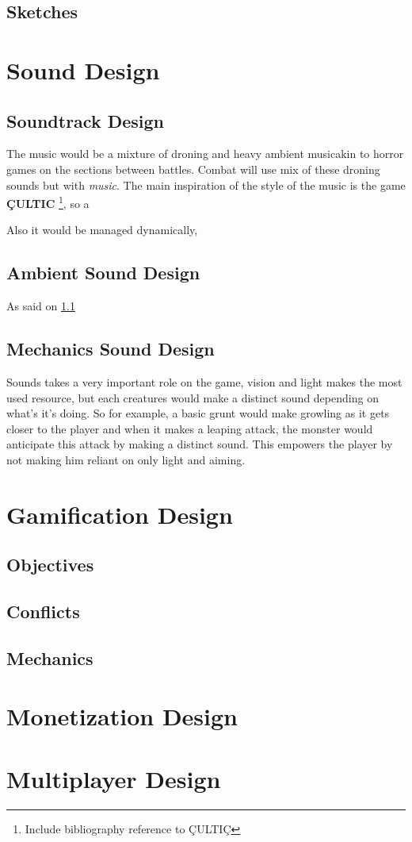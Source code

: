     \subsection{Sketches}

\section{Sound Design}
    \subsection{Soundtrack Design} \label{ost}
        The music would be a mixture of droning and heavy ambient musicakin to horror games on the sections between battles. Combat will use mix of these droning sounds but with \textit{music}.
        The main inspiration of the style of the music is the game \textbf{ÇULTIC} \footnote{Include bibliography reference to ÇULTIÇ}, so a

        Also it would be managed dynamically,

    \subsection{Ambient Sound Design}
        As said on \ref{ost}
    \subsection{Mechanics Sound Design}
        Sounds takes a very important role on the game, vision and light makes the most used resource, but each creatures would make a distinct sound depending on what's it's doing.
        So for example, a basic grunt would make growling as it gets closer to the player and when it makes a leaping attack, the monster would anticipate this attack by making a distinct sound.
        This empowers the player by not making him reliant on only light and aiming.

\section{Gamification Design}
    \subsection{Objectives}
    \subsection{Conflicts}
    \subsection{Mechanics}

\section{Monetization Design}

\section{Multiplayer Design}



